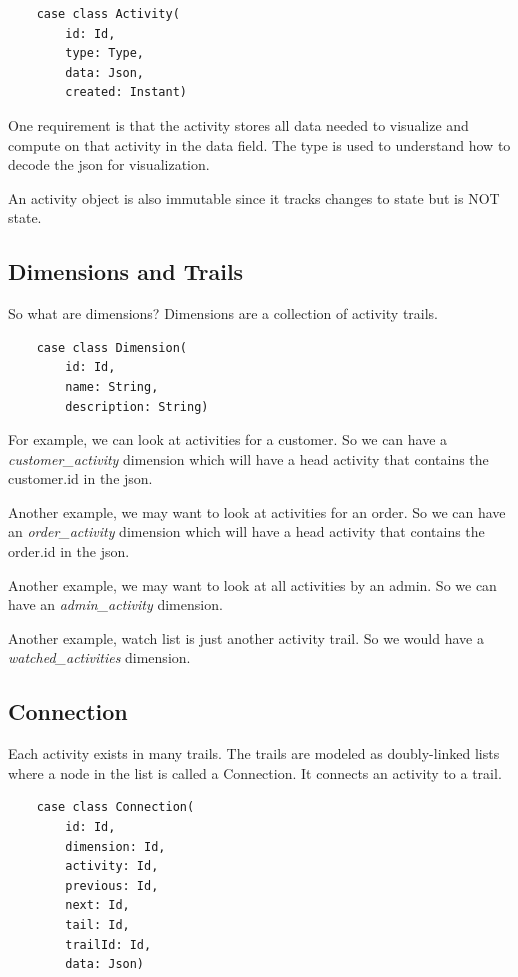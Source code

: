 \documentclass[11pt]{article}
\begin{document}
\begin{lstlisting}
    case class Activity(
        id: Id, 
        type: Type, 
        data: Json, 
        created: Instant)
\end{lstlisting}

One requirement is that the activity stores all data needed to visualize and compute on that activity in the data field. 
The type is used to understand how to decode the json for visualization.

An activity object is also immutable since it tracks changes to state but is NOT state.

\subsection{Dimensions and Trails}

So what are dimensions? Dimensions are a collection of activity trails. 

\begin{lstlisting}
    case class Dimension(
        id: Id, 
        name: String, 
        description: String)
\end{lstlisting}

For example, we can look at activities for a customer. So we can have a \emph{customer\_activity}
dimension which will have a head activity that contains the customer.id in the json.

Another example, we may want to look at activities for an order. So we can have an \emph{order\_activity}
dimension which will have a head activity that contains the order.id in the json.

Another example, we may want to look at all activities by an admin. So we can have an \emph{admin\_activity}
dimension.

Another example, watch list is just another activity trail. So we would have a \emph{watched\_activities}
dimension. 

\subsection{Connection}

Each activity exists in many trails. The trails are modeled as doubly-linked lists where
a node in the list is called a Connection. It connects an activity to a trail.

\begin{lstlisting}
    case class Connection(
        id: Id, 
        dimension: Id, 
        activity: Id, 
        previous: Id, 
        next: Id, 
        tail: Id,
        trailId: Id,
        data: Json)
\end{lstlisting}
\end{document}
